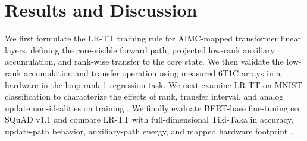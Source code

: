 \documentclass[AMA,LATO2COL]{WileyNJDv5}
\begin{document}

\section{Results and Discussion}
\label{sec:Results and Discussion}

\noindent
We first formulate the LR-TT training rule for AIMC-mapped transformer linear layers, defining the core-visible forward path, projected low-rank auxiliary accumulation, and rank-wise transfer to the core state.
We then validate the low-rank accumulation and transfer operation using measured 6T1C arrays in a hardware-in-the-loop rank-1 regression task.
We next examine LR-TT on MNIST classification to characterize the effects of rank, transfer interval, and analog update non-idealities on training \cite{lecun1998gradient}.
We finally evaluate BERT-base fine-tuning on SQuAD v1.1 and compare LR-TT with full-dimensional Tiki-Taka in accuracy, update-path behavior, auxiliary-path energy, and mapped hardware footprint \cite{devlin2019bert,rajpurkar2016squad}.
\end{document}
